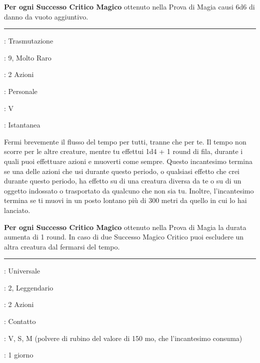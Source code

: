 \begin{multicols}{2}
\textbf{Per ogni Successo Critico Magico} ottenuto nella Prova di Magia causi 6d6 di danno da vuoto aggiuntivo.

\smallskip\noindent\rule{\linewidth}{2pt} \hypertarget{Fermare il Tempo}{}\smallskip{}
\noindent
\begin{description}[noitemsep, topsep=0pt, parsep=0pt, partopsep=0pt, leftmargin=0cm, labelwidth=2.8cm]
	\item[\textbf{Lista di Magia}]: Trasmutazione
	\item[\textbf{Livello}]: 9, Molto Raro
	\item[\textbf{T. di Lancio}]: 2 Azioni
	\item[\textbf{Gittata}]: Personale
	\item[\textbf{Componenti}]: V
	\item[\textbf{Durata}]: Istantanea
\end{description}

Fermi brevemente il flusso del tempo per tutti, tranne che per te. Il tempo non scorre per le altre creature, mentre tu effettui 1d4 + 1 round di fila, durante i quali puoi effettuare azioni e muoverti come sempre. Questo incantesimo termina se una delle azioni che usi durante questo periodo, o qualsiasi effetto che crei durante questo periodo, ha effetto su di una creatura diversa da te o su di un oggetto indossato o trasportato da qualcuno che non sia tu. Inoltre, l'incantesimo termina se ti muovi in un posto lontano più di 300 metri da quello in cui lo hai lanciato.

\textbf{Per ogni Successo Critico Magico} ottenuto nella Prova di Magia la durata aumenta di 1 round. In caso di due Successo Magico Critico puoi escludere un altra creatura dal fermarsi del tempo.

\smallskip\noindent\rule{\linewidth}{2pt} \hypertarget{Fiamma Perenne}{}\smallskip{}
\noindent
\begin{description}[noitemsep, topsep=0pt, parsep=0pt, partopsep=0pt, leftmargin=0cm, labelwidth=2.8cm]
	\item[\textbf{Lista di Magia}]: Universale
	\item[\textbf{Livello}]: 2, Leggendario
	\item[\textbf{T. di Lancio}]: 2 Azioni
	\item[\textbf{Gittata}]: Contatto
	\item[\textbf{Componenti}]: V, S, M (polvere di rubino del valore di 150 mo, che l'incantesimo consuma)
	\item[\textbf{Durata}]: 1 giorno
\end{description}


\end{multicols}
